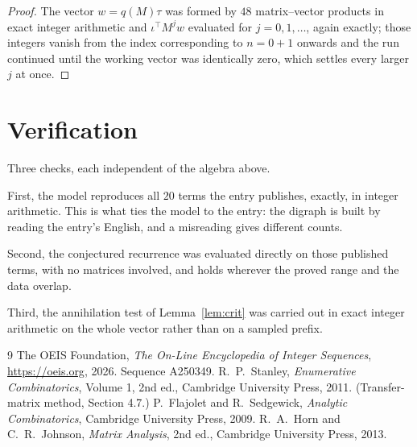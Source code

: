 \documentclass[11pt,a4paper]{article}
\theoremstyle{plain}
\theoremstyle{definition}
\begin{document}
\begin{proof}
The vector $w=q(M)\tau$ was formed by $48$ matrix--vector products in exact integer
arithmetic and $\iota^{\!\top}M^{j}w$ evaluated for $j=0,1,\dots$, again exactly; those
integers vanish from the index corresponding to $n=0+1$ onwards and the run continued
until the working vector was identically zero, which settles every larger $j$ at once.
\end{proof}

\section{Verification}

Three checks, each independent of the algebra above.

First, the model reproduces all $20$ terms the entry publishes, exactly, in integer
arithmetic. This is what ties the model to the entry: the digraph is built by reading the
entry's English, and a misreading gives different counts.

Second, the conjectured recurrence was evaluated directly on those published terms, with no
matrices involved, and holds wherever the proved range and the data overlap.

Third, the annihilation test of Lemma~\ref{lem:crit} was carried out in exact integer
arithmetic on the whole vector rather than on a sampled prefix.

\begin{thebibliography}{9}
 The OEIS Foundation, \emph{The On-Line Encyclopedia of Integer
Sequences}, \url{https://oeis.org}, 2026. Sequence A250349.
 R.~P.~Stanley, \emph{Enumerative Combinatorics}, Volume 1, 2nd ed.,
Cambridge University Press, 2011. (Transfer-matrix method, Section 4.7.)
 P.~Flajolet and R.~Sedgewick, \emph{Analytic Combinatorics}, Cambridge
University Press, 2009.
 R.~A.~Horn and C.~R.~Johnson, \emph{Matrix Analysis}, 2nd ed., Cambridge
University Press, 2013.
\end{thebibliography}
\end{document}
